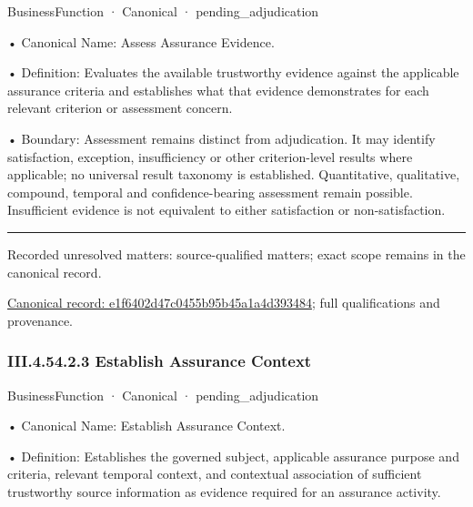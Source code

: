 \label{element:e1f6402d47c0455b95b45a1a4d393484}
{\small BusinessFunction · Canonical · pending\_adjudication}\par

•
Canonical Name: Assess Assurance Evidence.



•
Definition: Evaluates the available trustworthy evidence against the applicable assurance criteria and establishes what that evidence demonstrates for each relevant criterion or assessment concern.



•
Boundary: Assessment remains distinct from adjudication. It may identify satisfaction, exception, insufficiency or other criterion-level results where applicable; no universal result taxonomy is established. Quantitative, qualitative, compound, temporal and confidence-bearing assessment remain possible. Insufficient evidence is not equivalent to either satisfaction or non-satisfaction.



\medskip\hrule\medskip

{\small Recorded unresolved matters: source-qualified matters; exact scope remains in the canonical record.}\par
{\footnotesize \href{../../../../continuum/business/business-function/e1f6402d47c0455b95b45a1a4d393484.md}{Canonical record: e1f6402d47c0455b95b45a1a4d393484}; full qualifications and provenance.}\par
\subsubsection*{III.4.54.2.3 Establish Assurance Context}
\label{navigation:III.4.54.2.3}

\label{element:ffffe352e28c4e878d986b0e15ddff15}
{\small BusinessFunction · Canonical · pending\_adjudication}\par

•
Canonical Name: Establish Assurance Context.



•
Definition: Establishes the governed subject, applicable assurance purpose and criteria, relevant temporal context, and contextual association of sufficient trustworthy source information as evidence required for an assurance activity.




